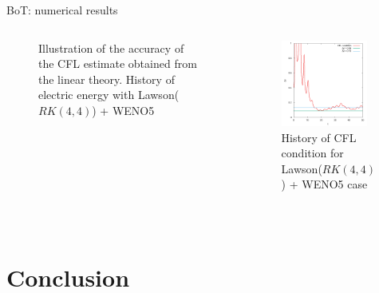 \documentclass{beamer}
\begin{document}
\begin{frame}{BoT: numerical results}
{\begin{columns}
\begin{column}{0.5\textwidth}
\begin{figure}
          \caption{Illustration of the accuracy of the CFL estimate obtained from the linear theory. History of electric energy with Lawson($RK(4,4)$) + WENO5}
        \end{figure}
        \vfill
        \ 
      \end{column}
      \begin{column}{0.5\textwidth}
        \begin{figure}
          \includegraphics[width=0.9\textwidth]{img/bot_cfl_weno_rk44.png}
          \caption{History of CFL condition for Lawson($RK(4,4)$) + WENO5 case}
        \end{figure}
        \vfill
        \ 
      \end{column}
    \end{columns}
  }
\end{frame}

\section{Conclusion}
\end{document}
